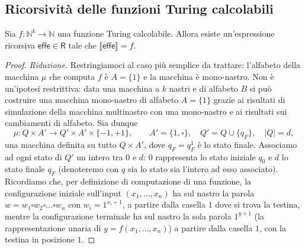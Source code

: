 \subsection{Ricorsività delle funzioni Turing calcolabili}

\begin{theo}
Sia $f\colon\mathbb N^k\to\mathbb N$ una funzione Turing calcolabile. Allora esiste un'espressione ricorsiva $\mathsf{effe}\in\mathsf R$ tale che $\llbracket\mathsf{effe}\rrbracket=f$.
\end{theo}

\begin{proof}
\emph{Riduzione.} Restringiamoci al caso più semplice da trattare: l'alfabeto della macchina $\mu$ che computa $f$ è $A=\{1\}$ e la macchina è mono-nastro. Non è un'ipotesi restrittiva: data una macchina a $k$ nastri e di alfabeto $B$ si può costruire una macchina mono-nastro di alfabeto $A=\{1\}$ grazie ai risultati di simulazione della macchina multinastro con una mono-nastro e ai risultati sui cambiamenti di alfabeto.
Sia dunque
\[
\mu\colon Q\times A'\to Q'\times A'\times\{-1,+1\},\qquad A'=\{1,\square\},\quad Q'=Q\cup\{q_F\},\quad |Q|=d,
\]
una macchina definita su tutto $Q\times A'$, dove $q_F=q_F^1$ è lo stato finale. Associamo ad ogni stato di $Q'$ un intero tra $0$ e $d$: $0$ rappresenta lo stato iniziale $q_0$ e $d$ lo stato finale $q_F$ (denoteremo con $q$ sia lo stato sia l'intero ad esso associato).
Ricordiamo che, per definizione di computazione di una funzione, la configurazione iniziale sull'input $(x_1,\dots,x_n)$ ha sul nastro la parola $w=w_1\square w_2\square\dots\square w_n$ con $w_i=1^{x_i+1}$, a partire dalla casella $1$ dove si trova la testina, mentre la configurazione terminale ha sul nastro la sola parola $1^{y+1}$ (la rappresentazione unaria di $y=f(x_1,\dots,x_n)$) a partire dalla casella $1$, con la testina in posizione $1$.


\end{proof}
